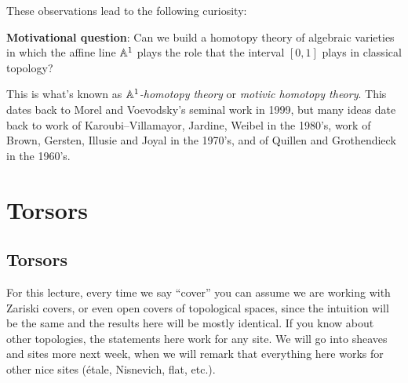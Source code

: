 \documentclass[11pt,openany]{book}
\begin{document}
These observations lead to the following curiosity:

\textbf{Motivational question}: Can we build a homotopy theory of algebraic varieties in which the affine line $\mathbb{A}^1$ plays the role that the interval $[0,1]$ plays in classical topology?

This is what's known as \textit{$\mathbb{A}^1$-homotopy theory} or \textit{motivic homotopy theory}. This dates back to Morel and Voevodsky's seminal work in 1999, but many ideas date back to work of Karoubi--Villamayor, Jardine, Weibel in the 1980's, work of Brown, Gersten, Illusie and Joyal in the 1970's, and of Quillen and Grothendieck in the 1960's.




\chapter{Torsors}
\minitoc
\section{Torsors}

\begin{assumption} For this lecture, every time we say ``cover'' you can assume we are working with Zariski covers, or even open covers of topological spaces, since the intuition will be the same and the results here will be mostly identical. If you know about other topologies, the statements here work for any site. We will go into sheaves and sites more next week, when we will remark that everything here works for other nice sites (\'etale, Nisnevich, flat, etc.).
\end{assumption}
\end{document}
